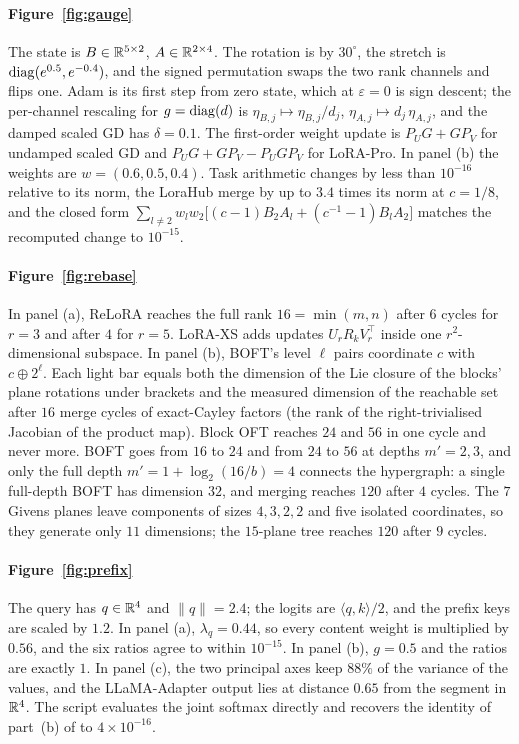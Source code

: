\paragraph{Figure~\ref{fig:gauge}} The state is $B\in\mathbb{R}^{5\times2}$, $A\in\mathbb{R}^{2\times4}$. The rotation is by $30^\circ$,
the stretch is $\operatorname{diag}(e^{0.5},e^{-0.4})$, and the signed permutation swaps the two rank channels and flips one. Adam is
its first step from zero state, which at $\varepsilon=0$ is sign descent; the per-channel rescaling for $g=\operatorname{diag}(d)$ is
$\eta_{B,j}\mapsto\eta_{B,j}/d_j$, $\eta_{A,j}\mapsto d_j\,\eta_{A,j}$, and the damped scaled GD has $\delta=0.1$. The
first-order weight update is $P_UG+GP_V$ for undamped scaled GD and $P_UG+GP_V-P_UGP_V$ for LoRA-Pro. In panel (b) the
weights are $w=(0.6,0.5,0.4)$. Task arithmetic changes by less than $10^{-16}$ relative to its norm, the LoraHub merge by
up to $3.4$ times its norm at $c=1/8$, and the closed form
$\sum_{l\ne2}w_lw_2\big[(c-1)B_2A_l+(c^{-1}-1)B_lA_2\big]$ matches the recomputed change to $10^{-15}$.

\paragraph{Figure~\ref{fig:rebase}} In panel (a), ReLoRA reaches the full rank $16=\min(m,n)$ after $6$ cycles for $r=3$
and after $4$ for $r=5$. LoRA-XS adds updates $U_rR_kV_r^\top$ inside one $r^2$-dimensional subspace. In panel (b), BOFT's
level $\ell$ pairs coordinate $c$ with $c\oplus2^\ell$. Each light bar equals both the dimension of the Lie closure of the
blocks' plane rotations under brackets and the measured dimension of the reachable set after $16$ merge cycles of
exact-Cayley factors (the rank of the right-trivialised Jacobian of the product map). Block OFT reaches $24$ and $56$ in
one cycle and never more. BOFT goes from $16$ to $24$ and from $24$ to $56$ at depths $m'=2,3$, and only the full depth
$m'=1+\log_2(16/b)=4$ connects the hypergraph: a single full-depth BOFT has dimension $32$, and merging reaches $120$ after
$4$ cycles. The $7$ Givens planes leave components of sizes $4,3,2,2$ and five isolated coordinates, so they generate only
$11$ dimensions; the $15$-plane tree reaches $120$ after $9$ cycles.

\paragraph{Figure~\ref{fig:prefix}} The query has $q\in\mathbb{R}^4$ and $\lVert q\rVert=2.4$; the logits are $\langle q,k\rangle/2$,
and the prefix keys are scaled by $1.2$. In panel (a), $\lambda_q=0.44$, so every content weight is multiplied by $0.56$,
and the six ratios agree to within $10^{-15}$. In panel (b), $g=0.5$ and the ratios are exactly $1$. In panel (c), the two
principal axes keep $88\%$ of the variance of the values, and the LLaMA-Adapter output lies at distance $0.65$ from the
segment in $\mathbb{R}^4$. The script evaluates the joint softmax directly and recovers the identity of part~(b) of
 to $4\times10^{-16}$.
